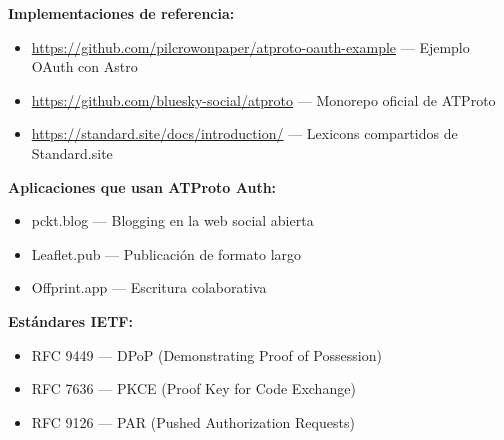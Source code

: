 \documentclass[10pt,letterpaper,twocolumn]{article}
\begin{document}
\textbf{Implementaciones de referencia:}
\begin{itemize}
  \item \url{https://github.com/pilcrowonpaper/atproto-oauth-example} --- Ejemplo OAuth con Astro
  \item \url{https://github.com/bluesky-social/atproto} --- Monorepo oficial de ATProto
  \item \url{https://standard.site/docs/introduction/} --- Lexicons compartidos de Standard.site
\end{itemize}

\textbf{Aplicaciones que usan ATProto Auth:}
\begin{itemize}
  \item pckt.blog --- Blogging en la web social abierta
  \item Leaflet.pub --- Publicación de formato largo
  \item Offprint.app --- Escritura colaborativa
\end{itemize}

\textbf{Estándares IETF:}
\begin{itemize}
  \item RFC 9449 --- DPoP (Demonstrating Proof of Possession)
  \item RFC 7636 --- PKCE (Proof Key for Code Exchange)
  \item RFC 9126 --- PAR (Pushed Authorization Requests)
\end{itemize}

\vspace{0.5em}



\end{document}
